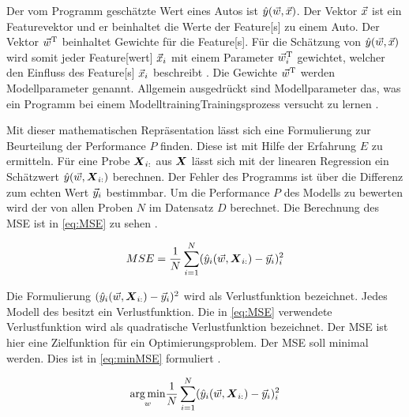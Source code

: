 Der vom Programm geschätzte Wert eines Autos ist \(\hat{y}(\vec{w}, \vec{x})\). Der Vektor \(\vec{x}\) ist ein \gls{Featurevektor} und er beinhaltet die Werte der \gls{Feature}[s] zu einem Auto. Der Vektor \(\vec{w}^\mathrm{T}\) beinhaltet Gewichte für die \gls{Feature}[s]. Für die Schätzung von \(\hat{y}(\vec{w}, \vec{x})\) wird somit jeder \gls{Feature}[wert] \(\vec{x}_i\) mit einem Parameter \(\vec{w}^\mathrm{T}_i\) gewichtet, welcher den Einfluss des \gls{Feature}[s] \(\vec{x}_i\) beschreibt \cite{Goodfellow.2016}. Die Gewichte \(\vec{w}^\mathrm{T}\) werden \gls{Modellparameter} genannt. Allgemein ausgedrückt sind \gls{Modellparameter} das, was ein Programm bei einem \gls{Modelltraining}{Trainingsprozess} versucht zu lernen \cite{Zheng.2015}. \par

Mit dieser mathematischen Repräsentation lässt sich eine Formulierung zur Beurteilung der Performance \(P\) finden. Diese ist mit Hilfe der Erfahrung \(E\) zu ermitteln. Für eine Probe \(\boldsymbol{X}_{i:}\) aus \(\boldsymbol{X}\) lässt sich mit der linearen Regression ein Schätzwert \(\hat{y}(\vec{w}, \boldsymbol{X}_{i:})\) berechnen. Der Fehler des Programms ist über die Differenz zum echten Wert \(\vec{y}_i\) bestimmbar. Um die Performance \(P\) des Modells zu bewerten wird der   von allen Proben \(N\) im Datensatz \(D\) berechnet. Die Berechnung des \gls{MSE} ist in \ref{eq:MSE} zu sehen \cite{Goodfellow.2016, Burkov.2019}.

\begin{equation}
    \label{eq:MSE}
    MSE = \frac{1}{N} \sum_{i=1}^{N} (\hat{y}_i(\vec{w}, \boldsymbol{X}_{i:}) - \vec{y}_i)_i^2
\end{equation}

Die Formulierung \((\hat{y}_i(\vec{w}, \boldsymbol{X}_{i:}) - \vec{y}_i)^2\) wird als \gls{Verlustfunktion} bezeichnet. Jedes Modell des  besitzt ein \gls{Verlustfunktion}. Die in \ref{eq:MSE} verwendete \gls{Verlustfunktion} wird als quadratische \gls{Verlustfunktion} bezeichnet. Der \gls{MSE} ist hier eine \gls{Zielfunktion} für ein Optimierungsproblem. Der \gls{MSE} soll minimal werden. Dies ist in \ref{eq:minMSE} formuliert \cite{Goodfellow.2016, Burkov.2019}.

\begin{equation}
    \label{eq:minMSE}
    \underset{w}{\arg\min} \frac{1}{N} \sum_{i=1}^{N} (\hat{y}_i(\vec{w}, \boldsymbol{X}_{i:}) - \vec{y}_i)_i^2
\end{equation}

